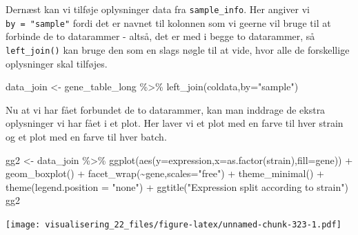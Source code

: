 \documentclass[
]{book}
\newenvironment{Shaded}{\begin{snugshade}}{\end{snugshade}}
\newcommand{\AttributeTok}[1]{\textcolor[rgb]{0.77,0.63,0.00}{#1}}
\newcommand{\FunctionTok}[1]{\textcolor[rgb]{0.00,0.00,0.00}{#1}}
\newcommand{\NormalTok}[1]{#1}
\newcommand{\OtherTok}[1]{\textcolor[rgb]{0.56,0.35,0.01}{#1}}
\newcommand{\SpecialCharTok}[1]{\textcolor[rgb]{0.00,0.00,0.00}{#1}}
\newcommand{\StringTok}[1]{\textcolor[rgb]{0.31,0.60,0.02}{#1}}
\begin{document}
Dernæst kan vi tilføje oplysninger data fra \texttt{sample\_info}. Her angiver vi \texttt{by\ =\ "sample"} fordi det er navnet til kolonnen som vi geerne vil bruge til at forbinde de to datarammer - altså, det er med i begge to datarammer, så \texttt{left\_join()} kan bruge den som en slags nøgle til at vide, hvor alle de forskellige oplysninger skal tilføjes.

\begin{Shaded}
\begin{Highlighting}[]
\NormalTok{data\_join }\OtherTok{\textless{}{-}}\NormalTok{ gene\_table\_long  }\SpecialCharTok{\%\textgreater{}\%} \FunctionTok{left\_join}\NormalTok{(coldata,}\AttributeTok{by=}\StringTok{"sample"}\NormalTok{)}
\end{Highlighting}
\end{Shaded}

Nu at vi har fået forbundet de to datarammer, kan man inddrage de ekstra oplysninger vi har fået i et plot. Her laver vi et plot med en farve til hver strain og et plot med en farve til hver batch.

\begin{Shaded}
\begin{Highlighting}[]
\NormalTok{gg2 }\OtherTok{\textless{}{-}}\NormalTok{ data\_join }\SpecialCharTok{\%\textgreater{}\%} 
  \FunctionTok{ggplot}\NormalTok{(}\FunctionTok{aes}\NormalTok{(}\AttributeTok{y=}\NormalTok{expression,}\AttributeTok{x=}\FunctionTok{as.factor}\NormalTok{(strain),}\AttributeTok{fill=}\NormalTok{gene)) }\SpecialCharTok{+} 
  \FunctionTok{geom\_boxplot}\NormalTok{() }\SpecialCharTok{+} 
  \FunctionTok{facet\_wrap}\NormalTok{(}\SpecialCharTok{\textasciitilde{}}\NormalTok{gene,}\AttributeTok{scales=}\StringTok{"free"}\NormalTok{) }\SpecialCharTok{+}
  \FunctionTok{theme\_minimal}\NormalTok{() }\SpecialCharTok{+}
  \FunctionTok{theme}\NormalTok{(}\AttributeTok{legend.position =} \StringTok{"none"}\NormalTok{) }\SpecialCharTok{+} 
  \FunctionTok{ggtitle}\NormalTok{(}\StringTok{"Expression split according to strain"}\NormalTok{)}
\NormalTok{gg2}
\end{Highlighting}
\end{Shaded}

\texttt{[image: visualisering\_22\_files/figure-latex/unnamed-chunk-323-1.pdf]}
\end{document}
